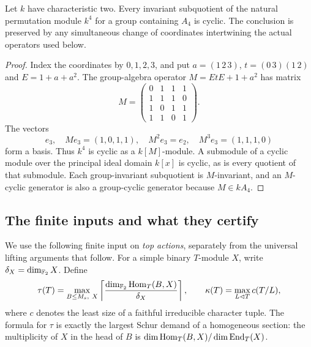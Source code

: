 \begin{samepage}
\begin{lemma}
\label{lem:alternating-four-cyclic}
Let $k$ have characteristic two. Every invariant subquotient of the
natural permutation module $k^4$ for a group containing $A_4$ is cyclic.
The conclusion is preserved by any simultaneous change of coordinates
intertwining the actual operators used below.
\end{lemma}
\begin{proof}
Index the coordinates by $0,1,2,3$, and put
$a=(1\,2\,3)$, $t=(0\,3)(1\,2)$ and $E=1+a+a^2$.
The group-algebra operator $M=EtE+1+a^2$ has matrix
\[
 M=\begin{pmatrix}
 0&1&1&1\\ 1&1&1&0\\ 1&0&1&1\\ 1&1&0&1
 \end{pmatrix}.
\]
The vectors
\[
 e_3,\quad Me_3=(1,0,1,1),\quad
 M^2e_3=e_2,\quad M^3e_3=(1,1,1,0)
\]
form a basis. Thus $k^4$ is cyclic as a $k[M]$-module. A submodule
of a cyclic module over the principal ideal domain $k[x]$ is cyclic,
as is every quotient of that submodule. Each group-invariant
subquotient is $M$-invariant, and an $M$-cyclic generator is also a
group-cyclic generator because $M\in kA_4$.
\end{proof}
\end{samepage}

\subsection{The finite inputs and what they certify}
\label{subsec:pair-finite-input}
We use the following finite input on \emph{top actions}, separately
from the universal lifting arguments that follow. For a simple binary
$T$-module $X$, write $\delta_X=\dim_{\mathbb F_2}X$. Define
\[
 \tau(T)=\max_{B\leq M_s,\ X}
 \left\lceil\frac{\dim_{\mathbb F_2}\operatorname{Hom}_T(B,X)}{\delta_X}\right\rceil,
 \qquad \kappa(T)=\max_{L\lhd T}c(T/L),
\]
where $c$ denotes the least size of a faithful irreducible character
tuple. The formula for $\tau$ is exactly the largest Schur demand of a
homogeneous section: the multiplicity of $X$ in the head of $B$ is
$\dim\operatorname{Hom}_T(B,X)/\dim\operatorname{End}_T(X)$.


